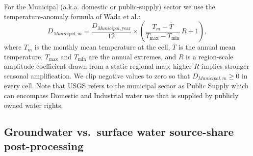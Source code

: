 \documentclass[fleqn,10pt]{wlscirep}
\begin{document}
For the Municipal (a.k.a. domestic or public-supply) sector we use the temperature-anomaly formula of Wada et al.\cite{Wada2011}:
\begin{equation}
D_{Municipal,m} = \frac{D_{Municipal,\mathrm{year}}}{12} \times \left(\frac{T_m - \bar{T}}{T_{\max} - T_{\min}}\,R + 1\right),
\label{eq:dom-monthly}
\end{equation}
where $T_m$ is the monthly mean temperature at the cell, $\bar{T}$ is the annual mean temperature, $T_{\max}$ and $T_{\min}$ are the annual extremes, and $R$ is a region-scale amplitude coefficient drawn from a static regional map; higher $R$ implies stronger seasonal amplification. We clip negative values to zero so that $D_{Municipal,m} \ge 0$ in every cell. Note that USGS refers to the municipal sector as Public Supply which can encompass Domestic and Industrial water use that is supplied by publicly owned water rights.

\subsection*{Groundwater vs.\ surface water source-share post-processing}
\end{document}
